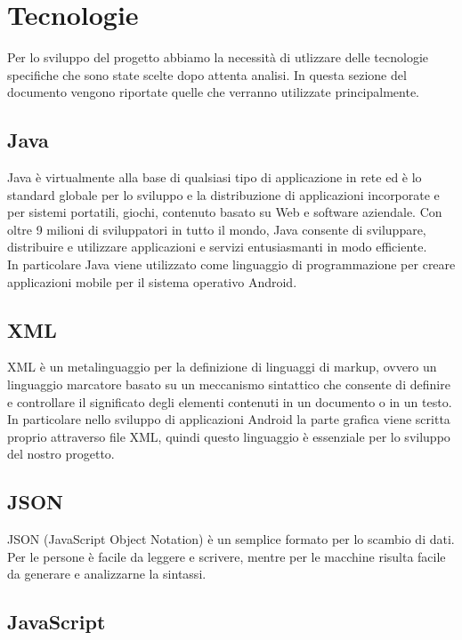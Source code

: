 \section{Tecnologie} 
\label{tecnologie}
Per lo sviluppo del progetto abbiamo la necessità di utlizzare delle tecnologie specifiche che sono state scelte dopo attenta analisi. 
In questa sezione del documento vengono riportate quelle che verranno utilizzate principalmente. 

\subsection{Java}
	
	Java è virtualmente alla base di qualsiasi tipo di applicazione in rete ed è lo standard globale per lo sviluppo e la distribuzione di applicazioni incorporate e per sistemi portatili, giochi, contenuto basato su Web e software aziendale. Con oltre 9 milioni di sviluppatori in tutto il mondo, Java consente di sviluppare, distribuire e utilizzare applicazioni e servizi entusiasmanti in modo efficiente. \\ 
	In particolare Java viene utilizzato come linguaggio di programmazione per creare applicazioni mobile per il sistema operativo Android.
	
\subsection{XML}
	
	XML è un metalinguaggio per la definizione di linguaggi di markup, ovvero un linguaggio marcatore basato su un meccanismo sintattico che consente di definire e controllare il significato degli elementi contenuti in un documento o in un testo.
	In particolare nello sviluppo di applicazioni Android la parte grafica viene scritta proprio attraverso file XML, quindi questo linguaggio è essenziale per lo sviluppo del nostro progetto.
	

\subsection{JSON}
	JSON (JavaScript Object Notation) è un semplice formato per lo scambio di dati. Per le persone è facile da leggere e scrivere, mentre per le macchine risulta facile da generare e analizzarne la sintassi.

\subsection{JavaScript}

